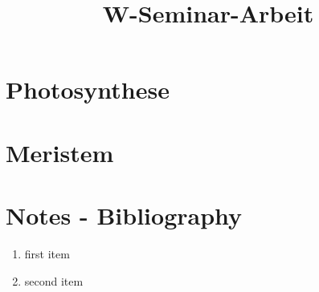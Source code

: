 \documentclass[a4paper, 11pt, ngerman]{scrreprt}
\title{W-Seminar-Arbeit}
\begin{document}
\tableofcontents

\chapter{Photosynthese}

\chapter{Meristem}

\chapter{Notes - Bibliography}

\begin{enumerate}
	\item first item
	\item second item 
\end{enumerate}
\end{document}
